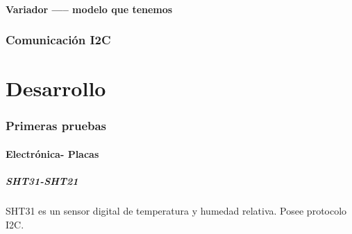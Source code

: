 \documentclass[12pt,a4paper]{article}
\begin{document}
	\subsection{Variador ----- modelo que tenemos}
	\section{Comunicación I2C}
	\newpage
	\part{Desarrollo}
	\section{Primeras pruebas}
	\subsection{Electrónica- Placas}
	\subsubsection{SHT31-SHT21}
	SHT31 es un sensor digital de temperatura y humedad relativa. Posee protocolo I2C.
\end{document}
